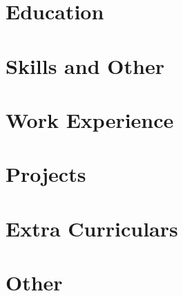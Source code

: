 \documentclass[a4paper,12pt]{article}
\begin{document}
\pagestyle{empty} 


\vspace{12pt}

\section{Education}

\vspace{12pt}

\section{Skills and Other}

\vspace{12pt}

\section{Work Experience}

\vspace{6pt}

\vspace{6pt}

\vspace{12pt}

\section{Projects}




\vspace{12pt}

\section{Extra Curriculars}

\vspace{12pt}

\section{Other}

\vspace{12pt}
\end{document}
